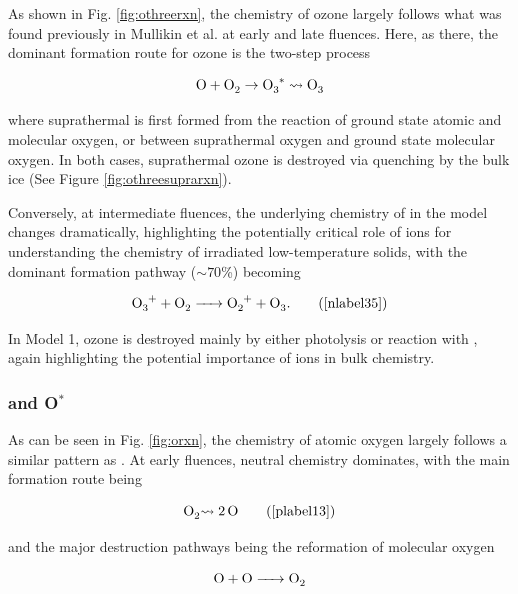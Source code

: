 \documentclass[journal=aesccq,manuscript=article,layout=twocolumn]{achemso}
\begin{document}
As shown in Fig. \ref{fig:othreerxn}, the chemistry of ozone largely follows what was found previously in Mullikin et al. \citep{mullikin_new_2021} at early and late fluences. Here, as there, the dominant formation route for ozone is the two-step process

\begin{equation}
    \ce{O} + \ce{O2} \rightarrow{} \ce{O3^*} \leadsto{} \ce{O3}
    \label{ozoneneutralformation}
\end{equation}

\noindent
where suprathermal  is first formed from the reaction of ground state atomic and molecular oxygen, or between suprathermal oxygen and ground state molecular oxygen. In both cases, suprathermal ozone is destroyed via quenching by the bulk ice (See Figure \ref{fig:othreesuprarxn}).

Conversely, at intermediate fluences, the underlying chemistry of  in the model changes dramatically, highlighting the potentially critical role of ions for understanding the chemistry of irradiated low-temperature solids, with the dominant formation pathway ($\sim70$\%) becoming

\begin{equation}
    \ce{O3+ + O2 -> O2+ + O3}.
    \tag{\ref{nlabel35}}
\end{equation}

In Model 1, ozone is destroyed mainly by either photolysis or reaction with , again highlighting the potential importance of ions in bulk chemistry. 


\subsubsection{ and O$^*$}


As can be seen in Fig. \ref{fig:orxn}, the chemistry of atomic oxygen largely follows a similar pattern as . At early fluences, neutral chemistry dominates, with the main formation route being

\begin{equation}
    \ce{O2 \leadsto{} 2O}
    \tag{\ref{plabel13}}
    \label{oformation}
\end{equation}

\noindent
and the major destruction pathways being the reformation of molecular oxygen

\begin{equation}
    \ce{O + O -> O2}
    \label{odestruction}
\end{equation}
\end{document}
